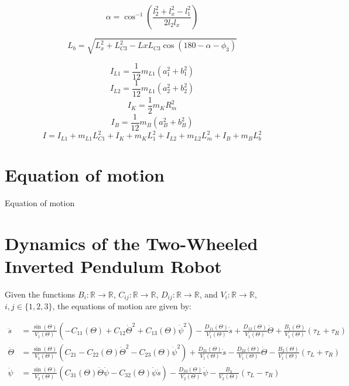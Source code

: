 \begin{equation}
	\alpha = \cos^{-1} \left( \frac{l_2^2 + l_{x}^2 - l_1^2}{2 l_2 l_{x}} \right) 
\end{equation}


\begin{equation}
	L_b = \sqrt{L_{x}^2 + L_{C3}^2 - Lx L_{C3} \cos(180 - \alpha - \phi_3 )}
\end{equation}

\begin{equation}
	I_{L1} = \frac{1}{12} m_{L1} (a_1^2 + b_1^2)
\end{equation}
\begin{equation}
	I_{L2} = \frac{1}{12} m_{L1} (a_2^2 + b_2^2)
\end{equation}
\begin{equation}
	I_K = \frac{1}{2} m_K R_m^2
\end{equation}
\begin{equation}
	I_B = \frac{1}{12} m_B (a_B^2 + b_B^2)
\end{equation}
\begin{equation}
	I = I_{L1} + m_{L1} L_{C1}^2 + I_K + m_K L_1^2 + I_{L2} + m_{L2} L_m^2 + I_B + m_B L_b^2
\end{equation}

\section{Equation of motion }
Equation of motion 





	
\section{Dynamics of the Two-Wheeled Inverted Pendulum Robot}
Given the functions $B_i: \mathbb{R} \rightarrow \mathbb{R}$, $C_{ij}: \mathbb{R} \rightarrow \mathbb{R}$, $D_{ij}: \mathbb{R} \rightarrow \mathbb{R}$, and $V_i: \mathbb{R} \rightarrow \mathbb{R}$, $i,j \in \{1,2,3\}$, the equations of motion are given by:
	
\begin{align}
	\ddot{s} &= \frac{\sin(\Theta)}{V_1(\Theta)} \left( -C_{11}(\Theta) + C_{12}\dot{\Theta}^2 + C_{13}(\Theta)\dot{\psi}^2 \right) - \frac{D_{11}(\Theta)}{V_1(\Theta)}\dot{s} + \frac{D_{12}(\Theta)}{V_1(\Theta)}\dot{\Theta} + \frac{B_{1}(\Theta)}{V_1(\Theta)}(\tau_L + \tau_R) \\
	\ddot{\Theta} &= \frac{\sin(\Theta)}{V_1(\Theta)} \left( C_{21} - C_{22}(\Theta)\dot{\Theta}^2 - C_{23}(\Theta)\dot{\psi}^2 \right) + \frac{D_{21}(\Theta)}{V_1(\Theta)}\dot{s} - \frac{D_{22}(\Theta)}{V_1(\Theta)}\dot{\Theta} - \frac{B_{2}(\Theta)}{V_1(\Theta)}(\tau_L + \tau_R)  \\
	\ddot{\psi} &= \frac{\sin(\Theta)}{V_2(\Theta)} \left( C_{31}(\Theta)\dot{\Theta}\dot{\psi} - C_{32}(\Theta)\dot{\psi}\dot{s} \right) - \frac{D_{33}(\Theta)}{V_2(\Theta)}\dot{\psi} - \frac{B_{3}}{V_2(\Theta)}(\tau_L - \tau_R)
\end{align}


